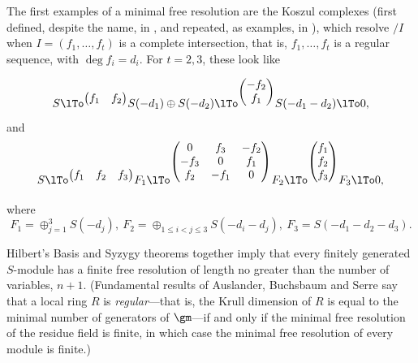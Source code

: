 The first examples of a minimal free resolution are the Koszul complexes
(first defined, despite the name, in \cite{Cayley}, and repeated, as examples, 
in \cite{Hilbert1890}), which resolve $/I$ when
 $I = (f_1,\dots, f_t)$
is a complete intersection, that is, $f_1,\dots, f_t$ is a regular sequence, with $\deg f_i = d_i$.  For $t = 2,3$, these look like

$$
S
\lTo^{ \begin{pmatrix}
f_1&f_2
\end{pmatrix}} 
S(-d_1)\oplus S(-d_2) 
\lTo^{\begin{pmatrix}
-f_2\\f_1
\end{pmatrix}}
 S(-d_1-d_2)\lTo 0,
$$
and
$$
S
\lTo^{
 \begin{pmatrix}
f_1&f_2&f_3
\end{pmatrix}} 
F_1\lTo^{
\begin{pmatrix}
 0&f_3&-f_2\\
 -f_3&0&f_1\\
 f_2&-f_1&0
\end{pmatrix}}
F_2
\lTo^{\begin{pmatrix}
f_1\\f_2\\f_3
\end{pmatrix}}
 F_3 \lTo 0,
$$

where
$$
F_1 = \oplus_{j=1}^3S(-d_j),\
 F_2=
\oplus_{1\leq i <j\leq 3} S(-d_i-d_j),\ 
F_3 = 
S(-d_1-d_2-d_3).
$$

%

Hilbert's Basis and Syzygy theorems together imply that every finitely generated $S$-module has a finite free resolution
of length no greater than the number of variables, $n+1$. (Fundamental
results of Auslander, Buchsbaum and Serre say that a local ring $R$ is \emph{regular}---that is, the Krull dimension of $R$ is equal to the minimal number
of generators of $\gm$---if and only if the minimal free resolution of the residue field is finite, in which case
the minimal free resolution of every module is finite.)

